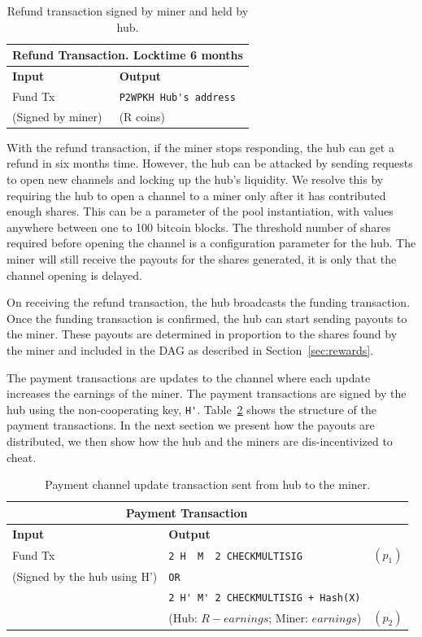 \documentclass{article}
\begin{document}
\begin{table}
  \centering
  \begin{tabular}{ ll }
    \multicolumn{2}{c}{\bfseries Refund Transaction. Locktime 6 months} \\
    \midrule
    \bfseries Input & \bfseries Output \\
    \midrule
    Fund Tx & \verb|P2WPKH Hub's address| \\
    (Signed by miner) & (R coins) \\
    \midrule
  \end{tabular}
  \caption{Refund transaction signed by miner and held by
    hub.}\label{refund-tx}
\end{table}

With the refund transaction, if the miner stops responding, the hub
can get a refund in six months time. However, the hub can be attacked
by sending requests to open new channels and locking up the hub's
liquidity. We resolve this by requiring the hub to open a channel to a
miner only after it has contributed enough shares. This can be a
parameter of the pool instantiation, with values anywhere between one
to 100 bitcoin blocks. The threshold number of shares required before
opening the channel is a configuration parameter for the hub. The
miner will still receive the payouts for the shares generated, it is
only that the channel opening is delayed.

On receiving the refund transaction, the hub broadcasts the funding
transaction. Once the funding transaction is confirmed, the hub can
start sending payouts to the miner. These payouts are determined in
proportion to the shares found by the miner and included in the DAG as
described in Section~\ref{sec:rewards}.

The payment transactions are updates to the channel where each update
increases the earnings of the miner. The payment transactions are
signed by the hub using the non-cooperating key, \verb|H'|.
Table~\ref{payment-transaction} shows the structure of the payment
transactions. In the next section we present how the payouts are
distributed, we then show how the hub and the miners are
dis-incentivized to cheat.


\begin{table}
  \centering
  \begin{tabular}{ llr }
    \multicolumn{2}{c}{\bfseries Payment Transaction} \\
    \midrule
    \bfseries Input & \bfseries Output \\
    \midrule
    Fund Tx & \verb|2 H  M  2 CHECKMULTISIG| & $(p_1)$ \\
    (Signed by the hub using H') & \verb|OR| \\
                    & \verb|2 H' M' 2 CHECKMULTISIG + Hash(X)| \\
                    & (Hub: $R - earnings$; Miner: $earnings$) & $(p_2)$\\
    \midrule
  \end{tabular}
  \caption{Payment channel update transaction sent from hub to the
    miner.}\label{payment-transaction}
\end{table}
\end{document}
